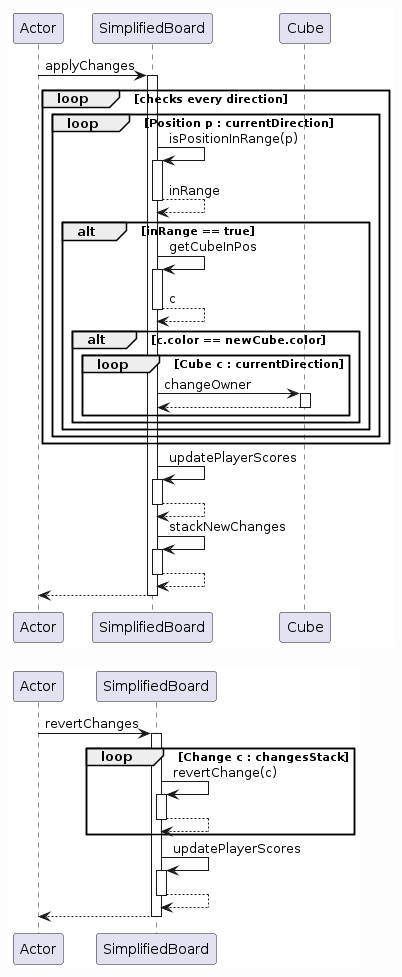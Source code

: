 \documentclass[../DocumentoOficial.tex]{subfiles}
\begin{document}
\begin{center}
\includegraphics[scale=0.65]{SimplifiedBoard.applyChanges()-sprint7.png} 
\end{center}

\begin{center}
\includegraphics[scale=0.7]{SimplifiedBoard.revertChanges()-sprint7.png} 
\end{center}
\end{document}
